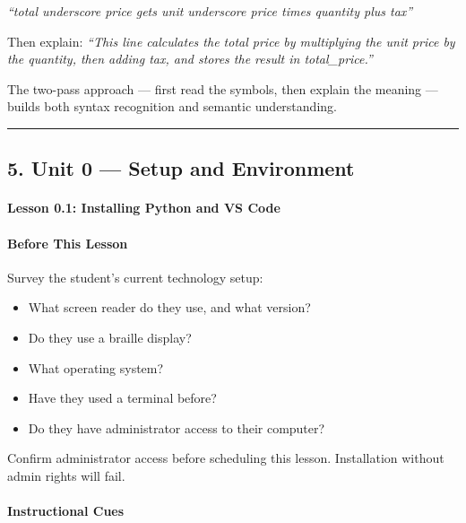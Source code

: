 \documentclass[
  justified,
  openright,
]{tufte-book}
\let\subsubsection\paragraph
\let\paragraph\paragraph
\let\subsubsection\paragraph
\let\paragraph\paragraph
\providecommand{\tightlist}{%
  \setlength{\itemsep}{0pt}\setlength{\parskip}{0pt}}
\begin{document}
\emph{``total underscore price gets unit underscore price times quantity
plus tax''}

Then explain: \emph{``This line calculates the total price by
multiplying the unit price by the quantity, then adding tax, and stores
the result in total\_price.''}

The two-pass approach --- first read the symbols, then explain the
meaning --- builds both syntax recognition and semantic understanding.

\begin{center}\rule{0.5\linewidth}{0.5pt}\end{center}

\subsection{5. Unit 0 --- Setup and
Environment}\label{unit-0-setup-and-environment}

\subsubsection{Lesson 0.1: Installing Python and VS
Code}\label{lesson-0.1-installing-python-and-vs-code}

\paragraph{Before This Lesson}\label{before-this-lesson}

Survey the student's current technology setup:

\begin{itemize}
\tightlist
\item
  What screen reader do they use, and what version?
\item
  Do they use a braille display?
\item
  What operating system?
\item
  Have they used a terminal before?
\item
  Do they have administrator access to their computer?
\end{itemize}

Confirm administrator access before scheduling this lesson. Installation
without admin rights will fail.

\paragraph{Instructional Cues}\label{instructional-cues}
\end{document}
